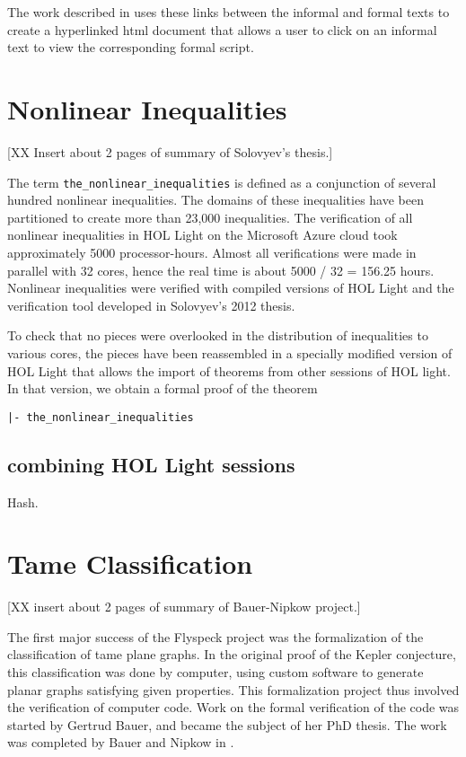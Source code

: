 The work described in \cite{Urban-K} uses these links between the informal and
formal texts to create a hyperlinked html document that allows a user to click
on an informal text to view the corresponding formal script.



\section{Nonlinear Inequalities}

[XX Insert about 2 pages of summary of Solovyev's thesis.]

The term \verb!the_nonlinear_inequalities! is defined as a conjunction of
several hundred nonlinear inequalities. The domains of these
inequalities have been partitioned to create more than 23,000
inequalities. The verification of all nonlinear inequalities in HOL
Light on the Microsoft Azure cloud took approximately 5000
processor-hours. Almost all verifications were made in parallel with
32 cores, hence the real time is about 5000 / 32 = 156.25
hours. Nonlinear inequalities were verified with compiled versions of
HOL Light and the verification tool developed in Solovyev's 2012
thesis.

To check that no pieces were overlooked in the distribution of
inequalities to various cores, the pieces have been reassembled in a
specially modified version of HOL Light that allows the import of
theorems from other sessions of HOL light. In that version, we obtain
a formal proof of the theorem

\begin{verbatim}
|- the_nonlinear_inequalities
\end{verbatim}

\subsection{combining HOL Light sessions}

Hash.


\section{Tame Classification}

[XX insert about 2 pages of summary of Bauer-Nipkow project.]

The first major success of the Flyspeck project was the formalization
of the classification of tame plane graphs.  In the original proof of
the Kepler conjecture, this classification was done by computer, using
custom software to generate planar graphs satisfying given
properties.  This formalization project thus involved the verification
of computer code.  Work on the formal verification of the code was
started by Gertrud Bauer, and became the subject of her PhD thesis.
The work was completed by Bauer and Nipkow in \cite{XX}.


